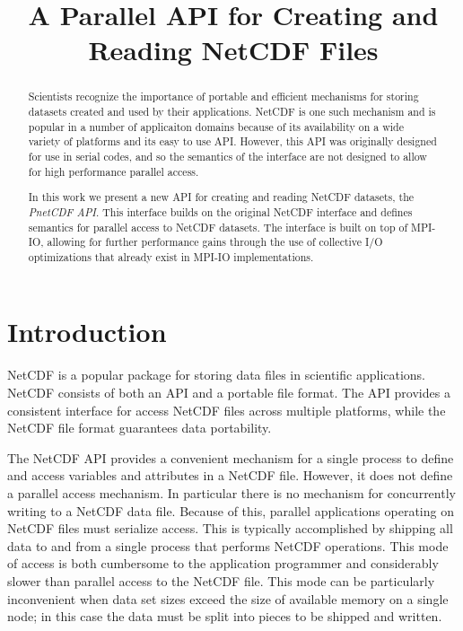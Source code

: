 \documentclass[10pt]{article}
\title{A Parallel API for Creating and Reading NetCDF Files}
\begin{document}
\maketitle

\begin{abstract}
Scientists recognize the importance of portable and efficient mechanisms for
storing datasets created and used by their applications.  NetCDF is one such
mechanism and is popular in a number of applicaiton domains because of its
availability on a wide variety of platforms and its easy to use API.  However,
this API was originally designed for use in serial codes, and so the semantics
of the interface are not designed to allow for high performance parallel
access.

In this work we present a new API for creating and reading NetCDF datasets,
the \emph{PnetCDF API}.  This interface builds on the original NetCDF
interface and defines semantics for parallel access to NetCDF datasets.  The
interface is built on top of MPI-IO, allowing for further performance gains
through the use of collective I/O optimizations that already exist in MPI-IO
implementations.

\end{abstract}

\section{Introduction}

NetCDF is a popular package for storing data files in scientific applications.
NetCDF consists of both an API and a portable file format.  The API provides a
consistent interface for access NetCDF files across multiple platforms, while
the NetCDF file format guarantees data portability.

The NetCDF API provides a convenient mechanism for a single process to define
and access variables and attributes in a NetCDF file.  However, it does not
define a parallel access mechanism.  In particular there is no mechanism for
concurrently writing to a NetCDF data file.  Because of this, parallel
applications operating on NetCDF files must serialize access.  This is
typically accomplished by shipping all data to and from a single process that
performs NetCDF operations.  This mode of access is both cumbersome to the
application programmer and considerably slower than parallel access to the
NetCDF file.  This mode can be particularly inconvenient when data set sizes
exceed the size of available memory on a single node; in this case the data
must be split into pieces to be shipped and written.
\end{document}
